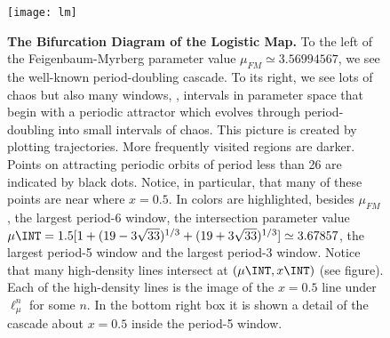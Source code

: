 \begin{figure}
 \centering
 \texttt{[image: lm]}
 \caption{{\bf The Bifurcation Diagram of the Logistic Map.} To the left of the Feigenbaum-Myrberg parameter value $\mu_{FM}\simeq3.56994567$, we see the well-known period-doubling cascade. To its right, we see lots of chaos but also many windows, \ie, intervals in parameter space that begin with a periodic attractor which evolves through period-doubling into small intervals of chaos. This picture is created by plotting trajectories. More frequently visited regions are darker. Points on attracting periodic orbits of period less than 26 are indicated by black dots. Notice, in particular, that many of these points are near where $x=0.5$. In colors are highlighted, besides $\mu_{FM}$, the largest period-6 window, the intersection parameter value $\mu\INT=1.5[ 1 + (19-3\sqrt{33})^{1/3} + (19+3\sqrt{33})^{1/3} ]\simeq3.67857$, the largest period-5 window and the largest period-3 window. Notice that many high-density lines intersect at $(\mu\INT,x\INT)$ (see figure). Each of the high-density lines is the image of the $x=0.5$ line under $\ell^n_\mu$ for some $n$. In the bottom right box it is shown a detail of the cascade about $x=0.5$ inside the period-5 window.
 }
 \label{fig:lmbd}
\end{figure} 

